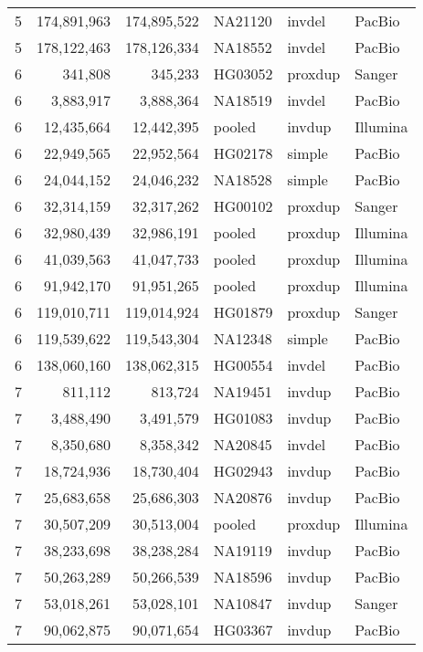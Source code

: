 {\begin{tiny}
\begin{longtable}{rrrlll}
    5   & 174,891,963 & 174,895,522 & NA21120 & invdel  & PacBio  \\
    5   & 178,122,463 & 178,126,334 & NA18552 & invdel  & PacBio  \\
    6   & 341,808     & 345,233     & HG03052 & proxdup & Sanger  \\
    6   & 3,883,917   & 3,888,364   & NA18519 & invdel  & PacBio  \\
    6   & 12,435,664  & 12,442,395  & pooled  & invdup  & Illumina  \\
    6   & 22,949,565  & 22,952,564  & HG02178 & simple  & PacBio  \\
    6   & 24,044,152  & 24,046,232  & NA18528 & simple  & PacBio  \\
    6   & 32,314,159  & 32,317,262  & HG00102 & proxdup & Sanger  \\
    6   & 32,980,439  & 32,986,191  & pooled  & proxdup & Illumina  \\
    6   & 41,039,563  & 41,047,733  & pooled  & proxdup & Illumina  \\
    6   & 91,942,170  & 91,951,265  & pooled  & proxdup & Illumina  \\
    6   & 119,010,711 & 119,014,924 & HG01879 & proxdup & Sanger  \\
    6   & 119,539,622 & 119,543,304 & NA12348 & simple  & PacBio  \\
    6   & 138,060,160 & 138,062,315 & HG00554 & invdel  & PacBio  \\
    7   & 811,112     & 813,724     & NA19451 & invdup  & PacBio  \\
    7   & 3,488,490   & 3,491,579   & HG01083 & invdup  & PacBio  \\
    7   & 8,350,680   & 8,358,342   & NA20845 & invdel  & PacBio  \\
    7   & 18,724,936  & 18,730,404  & HG02943 & invdup  & PacBio  \\
    7   & 25,683,658  & 25,686,303  & NA20876 & invdup  & PacBio  \\
    7   & 30,507,209  & 30,513,004  & pooled  & proxdup & Illumina  \\
    7   & 38,233,698  & 38,238,284  & NA19119 & invdup  & PacBio  \\
    7   & 50,263,289  & 50,266,539  & NA18596 & invdup  & PacBio  \\
    7   & 53,018,261  & 53,028,101  & NA10847 & invdup  & Sanger  \\
    7   & 90,062,875  & 90,071,654  & HG03367 & invdup  & PacBio  \\

\end{longtable}
\end{tiny}}
